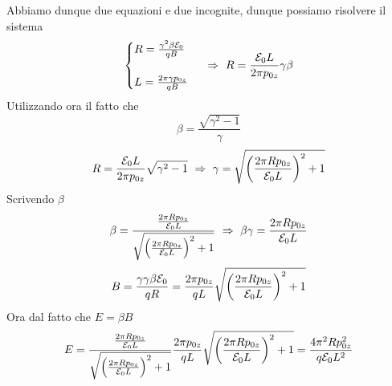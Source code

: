 \documentclass[12pt,twoside,a4]{article}
\begin{document}
\begin{solution}
Abbiamo dunque due equazioni e due incognite, dunque possiamo risolvere il sistema
$$ \begin{cases}
R =  \frac{\gamma^2 \beta \mathcal{E}_0}{q B} \\ \\
L = \frac{2 \pi \gamma p_{0z}}{q B}
\end{cases}  \  \Rightarrow  \  R = \frac{\mathcal{E}_0 L}{2\pi p_{0z}} \gamma \beta$$
Utilizzando ora il fatto che
$$ \beta = \frac{ \sqrt{\gamma^2 -1}}{\gamma}$$
$$ R = \frac{\E_0 L}{2\pi p_{0z}} \sqrt{\gamma^2 -1}  \  \Rightarrow  \ 
\gamma = \sqrt{\tonde{\frac{2 \pi R p_{0z}}{\E_0 L}}^2 + 1}$$
Scrivendo $\beta$
$$ \beta = \frac{\frac{2\pi R p_{0z}}{\mathcal{E}_0 L}}{\sqrt{\left({\frac{2 \pi R p_{0z}}{\mathcal{E}_0 L}}\right)^2 + 1}}  \  \Rightarrow  \  
\beta \gamma = \frac{2\pi R p_{0z}}{\mathcal{E}_0 L} $$
$$ B =  \frac{\gamma \gamma \beta \mathcal{E}_0}{q R } = 
\frac{2 \pi p_{0z}}{qL} \sqrt{\left({\frac{2 \pi R p_{0z}}{\mathcal{E}_0 L}}\right)^2 + 1} $$
Ora dal fatto che $E = \beta B$
$$ E = \frac{\frac{2\pi R p_{0z}}{\mathcal{E}_0 L}}{\sqrt{\left({\frac{2 \pi R p_{0z}}{\mathcal{E}_0 L}}\right)^2 + 1}} \frac{2 \pi p_{0z}}{qL} \sqrt{\left({\frac{2 \pi R p_{0z}}{\mathcal{E}_0 L}}\right)^2 + 1} = \frac{4 \pi^2 R p_{0z}^2}{q \mathcal{E}_0 L^2}$$
\end{solution}
\end{document}
